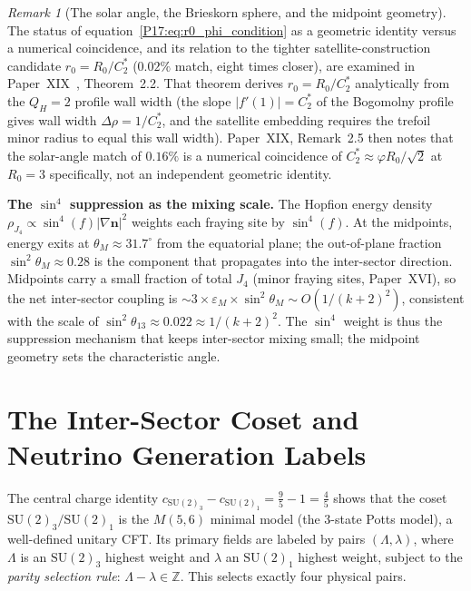 \documentclass[11pt,a4paper]{article}
\theoremstyle{definition}\newtheorem{definition}[theorem]{Definition}
\theoremstyle{remark}
\newtheorem{remark}[theorem]{Remark}
\newcommand{\vp}{\varphi}
\newcommand{\SU}{\mathrm{SU}}
\newcommand{\QH}{Q_H}
\begin{document}
\begin{remark}[The solar angle, the Brieskorn sphere, and the midpoint geometry]
The status of equation~\eqref{P17:eq:r0_phi_condition} as a geometric identity versus a
numerical coincidence, and its relation to the tighter satellite-construction
candidate $r_0=R_0/C_2^*$ ($0.02\%$ match, eight times closer), are examined
in Paper~XIX~\cite{Paper19}, Theorem~2.2. %
That theorem derives $r_0=R_0/C_2^*$ analytically from the
$\QH=2$ profile wall width (the slope $|f'(1)|=C_2^*$ of the
Bogomolny profile gives wall width $\Delta\rho=1/C_2^*$, and the
satellite embedding requires the trefoil minor radius to equal this
wall width).  Paper~XIX, Remark~2.5 %
then notes that the solar-angle match of $0.16\%$ is a numerical
coincidence of $C_2^*\approx\vp R_0/\sqrt{2}$ at $R_0=3$
specifically, not an independent geometric identity.

\textbf{The $\sin^4$ suppression as the mixing scale.}
The Hopfion energy density $\rho_{J_4}\propto\sin^4(f)|\nabla\mathbf{n}|^2$
weights each fraying site by $\sin^4(f)$.  At the midpoints, energy
exits at $\theta_M\approx31.7^\circ$ from the equatorial plane; the
out-of-plane fraction $\sin^2\theta_M\approx0.28$ is the component
that propagates into the inter-sector direction.  Midpoints carry a
small fraction of total $J_4$ (minor fraying sites, Paper~XVI), so the
net inter-sector coupling is $\sim 3\times\varepsilon_M\times
\sin^2\theta_M\sim O(1/(k+2)^2)$, consistent with the scale of
$\sin^2\theta_{13}\approx0.022\approx 1/(k+2)^2$.  The $\sin^4$
weight is thus the suppression mechanism that keeps inter-sector mixing
small; the midpoint geometry sets the characteristic angle.
\end{remark}



\section{The Inter-Sector Coset and Neutrino Generation Labels}
\label{P17:sec:coset}

The central charge identity
$c_{\SU(2)_3}-c_{\SU(2)_1}=\frac{9}{5}-1=\frac{4}{5}$
shows that the coset $\SU(2)_3/\SU(2)_1$ is the $M(5,6)$ minimal
model (the $3$-state Potts model), a well-defined unitary CFT.
Its primary fields are labeled by pairs $(\Lambda,\lambda)$, where
$\Lambda$ is an $\SU(2)_3$ highest weight and $\lambda$ an
$\SU(2)_1$ highest weight, subject to the \emph{parity selection
rule}: $\Lambda-\lambda\in\mathbb{Z}$.  This selects exactly four
physical pairs.
\end{document}
